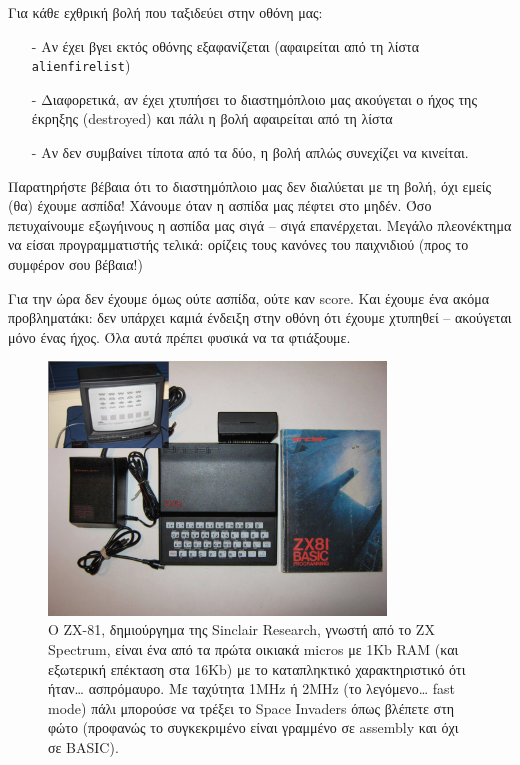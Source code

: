 Για κάθε εχθρική βολή που ταξιδεύει στην οθόνη μας:
%
\begin{itemize}
\item[-] Αν έχει βγει εκτός οθόνης εξαφανίζεται (αφαιρείται από τη λίστα {\tt alienfirelist})
\item[-] Διαφορετικά, αν έχει χτυπήσει το διαστημόπλοιο μας ακούγεται ο ήχος της έκρηξης (destroyed) και πάλι η βολή αφαιρείται από τη λίστα
\item[-] Αν δεν συμβαίνει τίποτα από τα δύο, η βολή απλώς συνεχίζει να κινείται.
\end{itemize}
%
Παρατηρήστε βέβαια ότι το διαστημόπλοιο μας δεν διαλύεται με τη βολή, όχι εμείς (θα) έχουμε ασπίδα! Χάνουμε όταν η ασπίδα μας πέφτει στο μηδέν. Όσο πετυχαίνουμε εξωγήινους η ασπίδα μας σιγά -- σιγά επανέρχεται. Μεγάλο πλεονέκτημα να είσαι προγραμματιστής τελικά: ορίζεις τους κανόνες του παιχνιδιού (προς το συμφέρον σου βέβαια!)

Για την ώρα δεν έχουμε όμως ούτε ασπίδα, ούτε καν score. Και έχουμε ένα ακόμα προβληματάκι: δεν υπάρχει καμιά ένδειξη στην οθόνη ότι έχουμε χτυπηθεί -- ακούγεται μόνο ένας ήχος. Όλα αυτά πρέπει φυσικά να τα φτιάξουμε.

\begin{figure}
\centering
\includegraphics[width=0.80\textwidth]{images/chapter9/zx81-invaders}
\caption[ZX-81 Invaders]{O ZX-81, δημιούργημα της Sinclair Research, γνωστή από το ZX Spectrum, είναι ένα από τα πρώτα οικιακά micros με 1Kb RAM (και εξωτερική επέκταση στα 16Kb) με το καταπληκτικό χαρακτηριστικό ότι ήταν\ldots{} ασπρόμαυρο. Με ταχύτητα 1MHz ή 2MHz (το λεγόμενο\ldots{} fast mode) πάλι μπορούσε να τρέξει το Space Invaders όπως βλέπετε στη φώτο (προφανώς το συγκεκριμένο είναι γραμμένο σε assembly και όχι σε BASIC).}
\label{9-3}
\end{figure}
%
